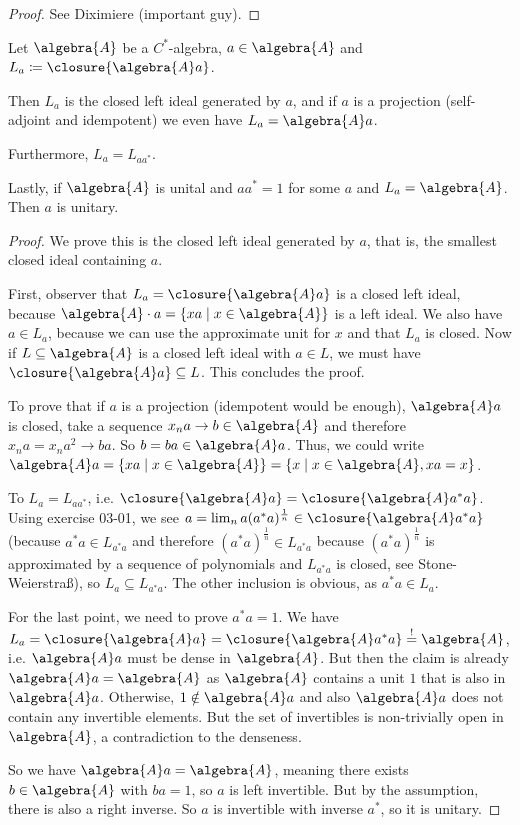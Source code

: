 \documentclass[a4paper]{article}
\begin{document}
\begin{proof}
	See Diximiere (important guy).
\end{proof}

\begin{exercise}
	Let $\algebra{A}$ be a $C^*$-algebra, $a \in \algebra{A}$ and $L_a \coloneq \closure{\algebra{A} a}$.
	
	Then $L_a$ is the closed left ideal generated by $a$, and if $a$ is a projection (self-adjoint and idempotent) we even have $L_a = \algebra{A} a$.

	Furthermore, $L_a = L_{a a^*}$.

	Lastly, if $\algebra{A}$ is unital and $aa^*=1$ for some $a$ and $L_a = \algebra{A}$. Then $a$ is unitary.

\end{exercise}

\begin{proof}
	We prove this is the closed left ideal generated by $a$, that is, the smallest closed ideal containing $a$.

	First, observer that $L_a = \closure{\algebra{A} a} $ is a closed left ideal, because $\algebra{A} \cdot a = \{ x a \mid x \in \algebra{A} \}$ is a left ideal.
	We also have $a \in L_a$, because we can use the approximate unit for $x$ and that $L_a$ is closed.
	Now if $L \subseteq \algebra{A}$ is a closed left ideal with $a \in L$, we must have $\closure{\algebra{A} a} \subseteq L$.
	This concludes the proof.

	To prove that if $a$ is a projection (idempotent would be enough), $\algebra{A} a$ is closed, take a sequence $x_n a \to b \in \algebra{A}$ and therefore $x_n a = x_n a^2 \to ba$.
	So $b = ba \in \algebra{A} a$.
	Thus, we could write $\algebra{A} a = \{ x a \mid x \in \algebra{A} \} = \{ x \mid x \in \algebra{A}, xa = x\}$.

	To $L_a = L_{a a^*}$, i.e. $\closure{\algebra{A}a} = \closure{\algebra{A} a^* a}$.
	Using exercise 03-01, we see $a = \lim_n a (a^* a)^{\frac{1}{n}} \in \closure{\algebra{A} a^* a}$ (because $a^* a \in L_{a^* a}$ and therefore $(a^* a)^\frac{1}{n} \in L_{a^* a}$ because $(a^* a)^\frac{1}{n}$ is approximated by a sequence of polynomials and $L_{a^* a}$ is closed, see Stone-Weierstraß), so $L_a \subseteq L_{a^* a}$. The other inclusion is obvious, as $a^* a \in L_a$.

	For the last point, we need to prove $a^*a = 1$. We have $L_a = \closure{\algebra{A} a} = \closure{\algebra{A} a ^* a} \overset{!}{=} \algebra{A}$, i.e. $\algebra{A} a$ must be dense in $\algebra{A}$.
	But then the claim is already $\algebra{A} a = \algebra{A}$ as $\algebra{A}$ contains a unit $1$ that is also in $\algebra{A} a$.
	Otherwise, $1 \notin \algebra{A} a$ and also $\algebra{A} a$ does not contain any invertible elements.
	But the set of invertibles is non-trivially open in $\algebra{A}$, a contradiction to the denseness.

	So we have $\algebra{A} a = \algebra{A}$, meaning there exists $b \in \algebra{A}$ with $b a = 1$, so $a$ is left invertible.
	But by the assumption, there is also a right inverse.
	So $a$ is invertible with inverse $a^*$, so it is unitary.
\end{proof}
\end{document}
